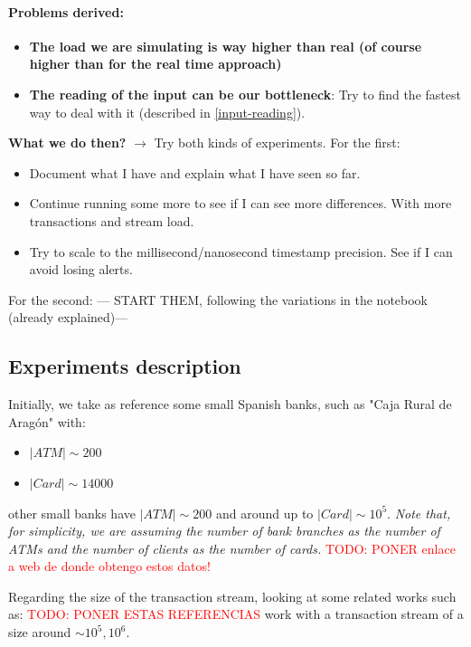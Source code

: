 \paragraph{Problems derived:\\}
\begin{itemize}
    \item \textbf{The load we are simulating is way higher than real (of course higher than for the real time approach)}
    \item \textbf{The reading of the input can be our bottleneck}: Try to find the fastest way to deal with it (described in \ref{input-reading}).    
\end{itemize}

\textbf{What we do then?}
$\rightarrow$ Try both kinds of experiments. 
For the first:
\begin{itemize}
    \item Document what I have and explain what I have seen so far.
    \item Continue running some more to see if I can see more differences. With more transactions and stream load.
    \item Try to scale to the millisecond/nanosecond timestamp precision. See if I can avoid losing alerts.
\end{itemize}
For the second:
--- START THEM, following the variations in the notebook (already explained)---

\subsection{Experiments description}

Initially, we take as reference some small Spanish banks, such as "Caja Rural de Aragón" with:
\begin{itemize}
  \item $|ATM| \sim 200$
  \item $|Card| \sim 14000$
\end{itemize}

other small banks have $|ATM| \sim 200$ and around up to $|Card| \sim 10^{5}$.
\textit{Note that, for simplicity, we are assuming the number of bank branches as the number of ATMs and the number of clients as the number of cards.}
\textcolor{red}{TODO: PONER enlace a web de donde obtengo estos datos!}


Regarding the size of the transaction stream, looking at some related works such as:
\textcolor{red}{TODO: PONER ESTAS REFERENCIAS}
work with a transaction stream of a size around $\sim 10^{5},10^{6}$.

